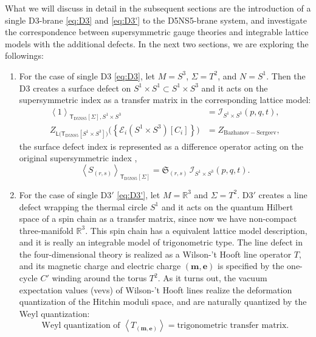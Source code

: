 What we will discuss in detail in the subsequent sections
are the introduction of a single D3-brane \eqref{eq:D3} and \eqref{eq:D3'} to the
D5NS5-brane system, and investigate the correspondence between supersymmetric gauge theories
and integrable lattice models with the additional
defects. In the next two sections, we are exploring the followings:
\begin{enumerate}
	\item For the case of single D3 \eqref{eq:D3}, let $M=S^{3}$, $\Sigma=T^{2}$, and $N=S^{1}$.
Then the D3 creates a surface defect on $S^{1}\times S^{1} \subset S^1\times S^3$ and it
acts on the supersymmetric index as a transfer matrix in the corresponding
lattice model:
\begin{align}
  \left\langle  1  \right\rangle_{\mathsf{T}_{\mathrm{D5NS5}}[\Sigma],S^{1}\times S^{3}}
    &  =  \mathcal{I}_{S^{1}\times S^{3}}(p,q,t),\\
  Z_{\mathsf{L}\big(\mathsf{T}_{\mathrm{D5NS5}}[S^{1}\times S^{3}]\big)}
    \big( \left\{ \mathcal{E}_{i}(S^{1}\times S^{3})[C_i]\right\} \big)
    &  =  Z_{\mathrm{Bazhanov-Sergeev}},
\end{align}
the surface defect index is represented as a difference operator
acting on the original supersymmetric index \cite{Gaiotto:2012xa,Gadde:2013dda},
\begin{equation}
  \left\langle S_{(r,s)}\right\rangle_{\mathsf{T}_{\mathrm{D5NS5}}[\Sigma]}
    =
      \mathfrak{S}_{(r,s)} \, \mathcal{I}_{S^{1}\times S^{3}}(p,q,t).
\end{equation}
\item For the case of single D3$'$ \eqref{eq:D3'}, let $M=\mathbb{R}^{3}$ and $\Sigma=T^{2}$.
D3$'$ creates a line defect wrapping the thermal circle $S^{1}$ and it acts on the quantum
Hilbert space of a spin chain as a transfer matrix, since now we have
non-compact three-manifold $\mathbb{R}^{3}$.
This spin chain has a equivalent lattice model description, and it is really an integrable model of
trigonometric type. The line defect in the
four-dimensional theory is realized as a Wilson-'t Hooft line operator
$T$, and its magnetic charge and electric charge $(\mathbf{m},\mathbf{e})$
is specified by the one-cycle $C'$ winding around the torus $T^{2}$. As it
turns out, the vacuum expectation values (vevs) of Wilson-'t Hooft
lines realize the deformation quantization of the Hitchin moduli space,
and are naturally quantized by the Weyl quantization:
\begin{equation}
  \textrm{Weyl quantization of }  \left\langle  T_{\left(\mathbf{m},\mathbf{e}\right)}  \right\rangle
  =  \textrm{trigonometric transfer matrix.}
\end{equation}
\end{enumerate}
%



















